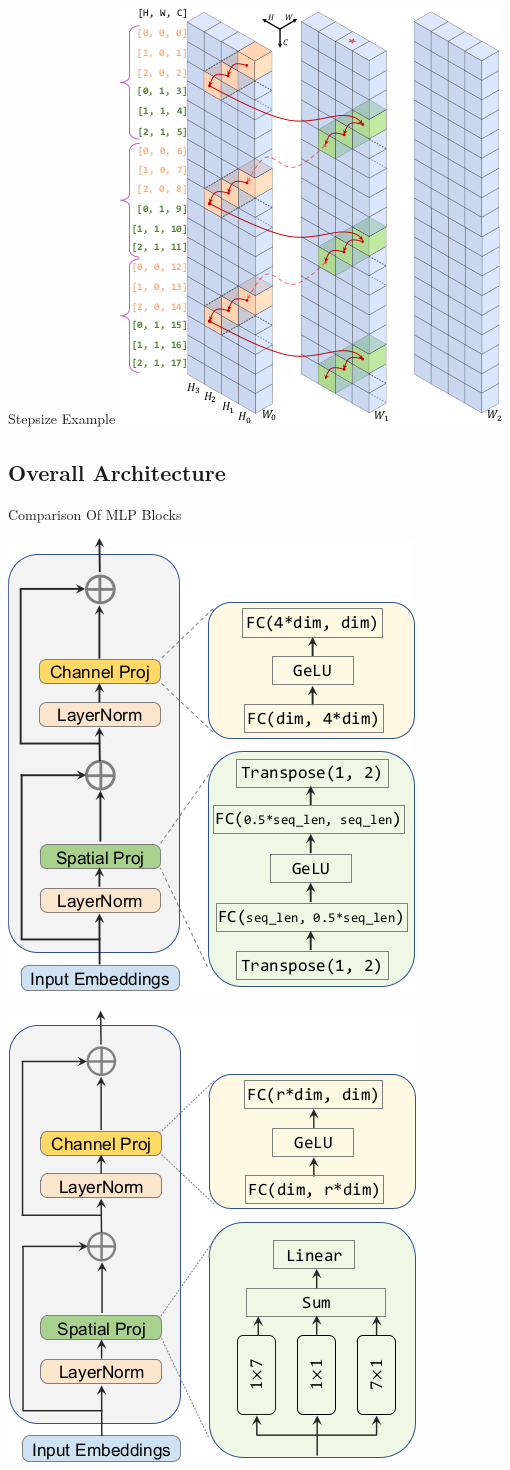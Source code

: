 \documentclass{beamer}
\begin{document}
\begin{frame}{Stepsize Example}
    \centering
    \includegraphics[height=.8\textheight]{figures/stepsize_3_2.png}
\end{frame}

\subsection{Overall Architecture}

\begin{frame}{Comparison Of MLP Blocks}
    \centering
    \parbox{.4\textwidth}{\centering \includegraphics[width=.4\textwidth]{figures/block_mlpmixer.png}}
    \parbox{.4\textwidth}{\centering \includegraphics[width=.4\textwidth]{figures/block_cyclemlp.png}}
\end{frame}
\end{document}
